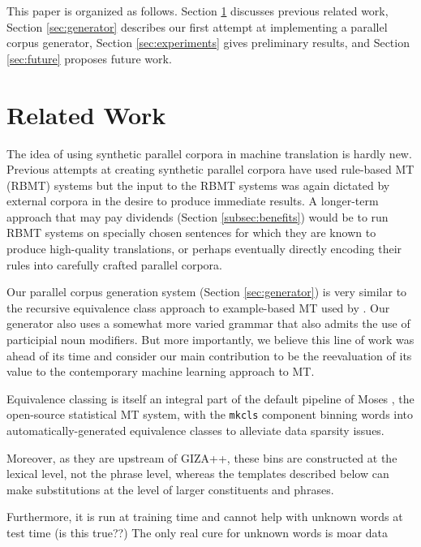 This paper is organized as follows.
Section \ref{sec:related} discusses previous related work,
Section \ref{sec:generator} describes our first attempt at implementing a parallel corpus generator,
Section \ref{sec:experiments} gives preliminary results, 
and Section \ref{sec:future} proposes future work.



\section{Related Work}
\label{sec:related}

The idea of using synthetic parallel corpora in machine translation is hardly new.
Previous attempts at creating synthetic parallel corpora have used rule-based MT (RBMT) systems  but the input to the RBMT systems was again dictated by external corpora in the desire to produce immediate results.
A longer-term approach that may pay dividends (Section \ref{subsec:benefits}) would be to run RBMT systems on specially chosen sentences for which they are known to produce high-quality translations, or perhaps eventually directly encoding their rules into carefully crafted parallel corpora.

Our parallel corpus generation system (Section \ref{sec:generator}) is very similar to the recursive equivalence class approach to example-based MT  used by . 
Our generator also uses a somewhat more varied grammar that also admits the use of participial noun modifiers.
But more importantly, we believe this line of work was ahead of its time and consider our main contribution to be the reevaluation of its value to the contemporary machine learning approach to MT.  

Equivalence classing is itself an integral part of the default pipeline of Moses , the open-source statistical MT system, with the {\small \tt mkcls} component  binning words into automatically-generated equivalence classes to alleviate data sparsity issues.

Moreover, as they are upstream of GIZA++, these bins are constructed at the lexical level, not the phrase level, whereas the templates described below can make substitutions at the level of larger constituents and phrases.

Furthermore, it is run at training time and cannot help with unknown words at test time (is this true??)
The only real cure for unknown words is moar data


